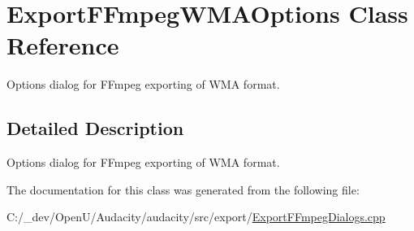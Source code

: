 \hypertarget{class_export_f_fmpeg_w_m_a_options}{}\section{Export\+F\+Fmpeg\+W\+M\+A\+Options Class Reference}
\label{class_export_f_fmpeg_w_m_a_options}


Options dialog for F\+Fmpeg exporting of W\+MA format.  




\subsection{Detailed Description}
Options dialog for F\+Fmpeg exporting of W\+MA format. 

The documentation for this class was generated from the following file\+:\begin{DoxyCompactItemize}
\item 
C\+:/\+\_\+dev/\+Open\+U/\+Audacity/audacity/src/export/\hyperlink{_export_f_fmpeg_dialogs_8cpp}{Export\+F\+Fmpeg\+Dialogs.\+cpp}\end{DoxyCompactItemize}
